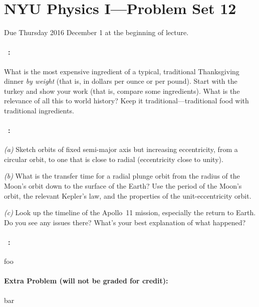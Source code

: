 \documentclass[12pt]{article}
\begin{document}
\section*{NYU Physics I---Problem Set 12}

Due Thursday 2016 December 1 at the beginning of lecture.

\paragraph{\problemname~\theproblem:}%
What is the most expensive ingredient of a typical, traditional
Thanksgiving dinner \emph{by weight} (that is, in dollars per ounce or
per pound).  Start with the turkey and show your work (that is,
compare some ingredients). What is the relevance of all this to world
history? Keep it traditional---traditional food with traditional
ingredients.

\paragraph{\problemname~\theproblem:}%
\textsl{(a)} Sketch orbits of fixed semi-major axis but increasing
eccentricity, from a circular orbit, to one that is close to radial
(eccentricity close to unity).

\textsl{(b)} What is the transfer time for a radial plunge orbit
from the radius of the Moon's orbit down to the surface of the Earth?
Use the period of the Moon's orbit, the relevant  Kepler's law, and
the properties of the unit-eccentricity orbit.

\textsl{(c)} Look up the timeline of the Apollo~11 mission, especially
the return to Earth.  Do you see any issues there? What's your best
explanation of what happened?

\paragraph{\problemname~\theproblem:}%
foo

\paragraph{Extra Problem (will not be graded for credit):}%
bar
\end{document}
